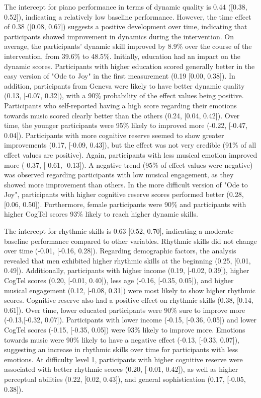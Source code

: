 The intercept for piano performance in terms of dynamic quality is 0.44 ([0.38, 0.52]), indicating a relatively low baseline performance. However, the time effect of 0.38 ([0.08, 0.67]) suggests a positive development over time, indicating that participants showed improvement in dynamics during the intervention. On average, the participants' dynamic skill improved by 8.9\% over the course of the intervention, from  39.6\% to 48.5\%. 
Initially, education had an impact on the dynamic scores. Participants with higher education scored generally better in the easy version of "Ode to Joy" in the first measurement (0.19 [0.00, 0.38]). In addition, participants from Geneva were likely to have better dynamic quality (0.13, [-0.07, 0.32]), with a 90\% probability of the effect values being positive. Participants who self-reported having a high score regarding their emotions towards music scored clearly better than the others (0.24, [0.04, 0.42]).
Over time, the younger participants were 95\% likely to improved more (-0.22, [-0.47, 0.04]). Participants with more cognitive reserve seemed to show greater improvements (0.17, [-0.09, 0.43]), but the effect was not very credible (91\% of all effect values are positive). Again, participants with less musical emotion improved more (-0.37, [-0.61, -0.13]). A negative trend (95\% of effect values were negative) was observed regarding participants with low musical engagement, as they showed more improvement than others. 
In the more difficult version of "Ode to Joy", participants with higher cognitive reserve scores performed better (0.28, [0.06, 0.50]). Furthermore, female participants were 90\% and participants with higher CogTel scores 93\% likely to reach higher dynamic skills. 

The intercept for rhythmic skills is 0.63 [0.52, 0.70], indicating a moderate baseline performance compared to other variables. Rhythmic skills did not change over time (-0.01, [-0.16, 0.28]).
Regarding demographic factors, the analysis revealed that men exhibited higher rhythmic skills at the beginning (0.25,  [0.01, 0.49]). Additionally, participants with higher income (0.19, [-0.02, 0.39]), higher CogTel scores (0.20, [-0.01, 0.40]), less age (-0.16, [-0.35, 0.05]), and higher musical engagement (0.12, [-0.08, 0.31]) were most likely to show higher rhythmic scores. Cognitive reserve also had a positive effect on rhythmic skills (0.38, [0.14, 0.61]).
Over time, lower educated participants were 90\% sure to improve more (-0.13,[-0.32, 0.07]). Participants with lower income (-0.15, [-0.36, 0.05]) and lower CogTel scores (-0.15, [-0.35, 0.05]) were 93\% likely to improve more. Emotions towards music were 90\% likely to have a negative effect (-0.13, [-0.33, 0.07]), suggesting an increase in rhythmic skills over time for participants with less emotions. 
At difficulty level 1, participants with higher cognitive reserve were associated with better rhythmic scores (0.20, [-0.01, 0.42]), as well as higher perceptual abilities (0.22, [0.02, 0.43]), and general sophistication (0.17, [-0.05, 0.38]).

